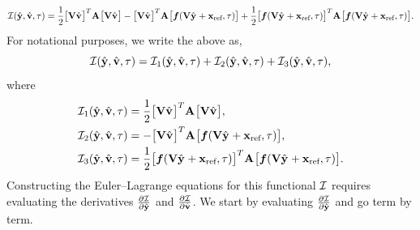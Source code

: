 \documentclass[3p,computermodern,10pt]{elsarticle}
\begin{document}
\begin{appendices}
\begin{equation}\label{eq:int_expand}
 \mathcal{I}(\hat{\mathbf{y}},\hat{\mathbf{v}},\tau)  = \frac{1}{2}\big[\mathbf {V} \hat{\mathbf{v}}^{}  \big]^T  \mathbf{A}^{}  \big[ \mathbf {V} \hat{\mathbf{v}}^{} \big]  -  \big[ \mathbf {V} \hat{\mathbf{v}}^{} \big]^T \mathbf{A}^{} \big[ \boldsymbol f(\mathbf {V} \hat{\mathbf{y}}^{} + \mathbf{x}_\text{ref},\tau) \big]  + \frac{1}{2}\big[\boldsymbol f(\mathbf {V} \hat{\mathbf{y}}^{} + \mathbf{x}_\text{ref},\tau) \big]^T \mathbf{A}^{} \big[ \boldsymbol f(\mathbf {V} \hat{\mathbf{y}}^{} + \mathbf{x}_\text{ref},\tau) \big].
\end{equation}
For notational purposes, we write the above as,
$$  \mathcal{I}(\hat{\mathbf{y}},\hat{\mathbf{v}},\tau) =  \mathcal{I}_1(\hat{\mathbf{y}},\hat{\mathbf{v}},\tau) +  \mathcal{I}_2(\hat{\mathbf{y}},\hat{\mathbf{v}},\tau) +  \mathcal{I}_3(\hat{\mathbf{y}},\hat{\mathbf{v}},\tau),$$
where
\begin{align*}
&\mathcal{I}_1(\hat{\mathbf{y}},\hat{\mathbf{v}},\tau) =  \frac{1}{2}\big[\mathbf {V} \hat{\mathbf{v}}^{}  \big]^T  \mathbf{A}^{}  \big[ \mathbf {V} \hat{\mathbf{v}}^{} \big], \\
&   \mathcal{I}_2(\hat{\mathbf{y}},\hat{\mathbf{v}},\tau) = -  \big[ \mathbf {V} \hat{\mathbf{v}}^{} \big]^T \mathbf{A}^{} \big[ \boldsymbol f(\mathbf {V} \hat{\mathbf{y}}^{} + \mathbf{x}_\text{ref},\tau) \big], \\
&  \mathcal{I}_3(\hat{\mathbf{y}},\hat{\mathbf{v}},\tau) = \frac{1}{2}\big[\boldsymbol f(\mathbf {V} \hat{\mathbf{y}}^{} + \mathbf{x}_\text{ref},\tau) \big]^T \mathbf{A}^{} \big[ \boldsymbol f(\mathbf {V} \hat{\mathbf{y}}^{} + \mathbf{x}_\text{ref},\tau) \big] . 
\end{align*}
Constructing the Euler--Lagrange equations for this functional $\mathcal{I}$ requires evaluating the derivatives $\frac{\partial \mathcal{I}}{\partial \hat{\mathbf{y}}}$ and $\frac{\partial \mathcal{I}}{\partial \hat{\mathbf{v}}}$. We start by evaluating $\frac{\partial \mathcal{I}}{\partial \hat{\mathbf{y}}}$ and go term by term.


\end{appendices}
\end{document}
